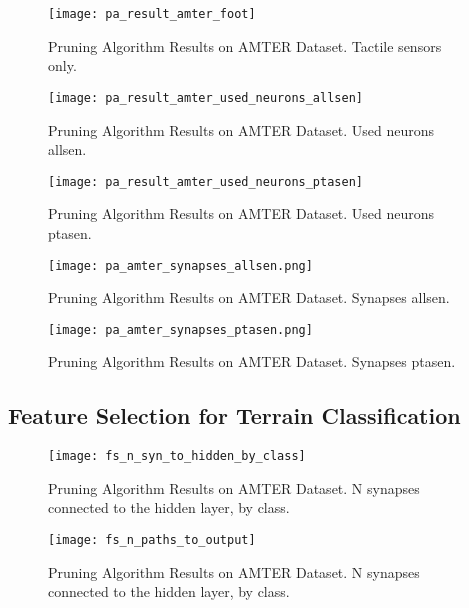 \begin{figure}[H]
  \centering
  \texttt{[image: pa\_result\_amter\_foot]}
  \caption{Pruning Algorithm Results on AMTER Dataset. Tactile sensors only.}
  \label{fig:pa_result_amter_foot}
\end{figure}

\begin{figure}[H]
  \centering
  \texttt{[image: pa\_result\_amter\_used\_neurons\_allsen]}
  \caption{Pruning Algorithm Results on AMTER Dataset. Used neurons allsen.}
  \label{fig:pa_amter_used_neurons_allsen}
\end{figure}

\begin{figure}[H]
  \centering
  \texttt{[image: pa\_result\_amter\_used\_neurons\_ptasen]}
  \caption{Pruning Algorithm Results on AMTER Dataset. Used neurons ptasen.}
  \label{fig:pa_amter_used_neurons_ptasen}
\end{figure}

\begin{figure}[H]
  \centering
  \texttt{[image: pa\_amter\_synapses\_allsen.png]}
  \caption{Pruning Algorithm Results on AMTER Dataset. Synapses allsen.}
  \label{fig:pa_amter_synapses_allsen}
\end{figure}

\begin{figure}[H]
  \centering
  \texttt{[image: pa\_amter\_synapses\_ptasen.png]}
  \caption{Pruning Algorithm Results on AMTER Dataset. Synapses ptasen.}
  \label{fig:pa_amter_synapses_ptasen}
\end{figure}

\subsection{Feature Selection for Terrain Classification} \label{ssec:pa_amter_feature_selection}

\begin{figure}[H]
  \centering
  \texttt{[image: fs\_n\_syn\_to\_hidden\_by\_class]}
  \caption{Pruning Algorithm Results on AMTER Dataset. N synapses connected to the hidden layer, by class.}
  \label{fig:pa_amter_n_syn_to_hidden_by_class}
\end{figure}

\begin{figure}[H]
  \centering
  \texttt{[image: fs\_n\_paths\_to\_output]}
  \caption{Pruning Algorithm Results on AMTER Dataset. N synapses connected to the hidden layer, by class.}
  \label{fig:pa_amter_n_syn_to_hidden_by_class}
\end{figure}

